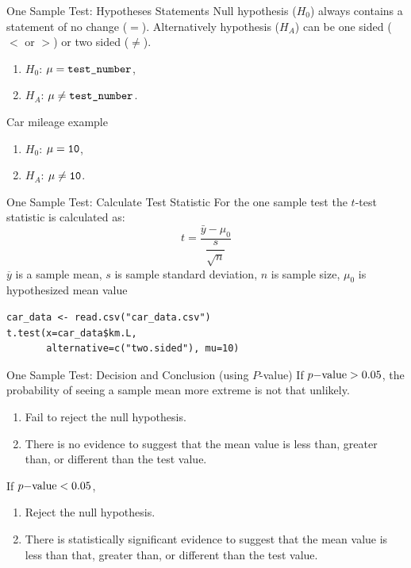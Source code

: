 \documentclass[xcolor=svgnames, 10pt, handout]{beamer}
\begin{document}
\begin{frame}[fragile]{One Sample Test: Hypotheses Statements}
Null hypothesis ($H_0$) always contains a statement of no change ($=$).
\vfill
Alternatively hypothesis ($H_A$) can be one sided ($<$ or $>$) or two sided ($\neq$).
\begin{enumerate}
\item $H_0$: $\mu = \verb|test_number|$,
\item $H_A$: $\mu \neq \verb|test_number|$.
\end{enumerate}
\vfill
Car mileage example
\begin{enumerate}
\item $H_0$: $\mu = \verb|10|$,
\item $H_A$: $\mu \neq \verb|10|$.
\end{enumerate}
\vfill
\end{frame}


\begin{frame}[fragile]{One Sample Test: Calculate Test Statistic}
\vfill
For the one sample test the $t$-test statistic is calculated as:
$$t = \dfrac{\bar y - \mu_0}{\dfrac{s}{\sqrt n}}$$
\vfill
$\overline y$ is a sample mean, $s$ is sample standard deviation, $n$ is sample size, $\mu_0$ is hypothesized mean value
\vfill
\begin{Verbatim}[xleftmargin=2em, xrightmargin=1.5em, frame=single, label=R code, framesep=0.5em]
car_data <- read.csv("car_data.csv")
t.test(x=car_data$km.L,
       alternative=c("two.sided"), mu=10)
\end{Verbatim}
\end{frame}


\begin{frame}[fragile]{One Sample Test: Decision and Conclusion (using $P$-value)}
\vfill
If $p{\rm-value} > 0.05$, the probability of seeing a sample mean more extreme is not that unlikely.
\begin{enumerate}
\item Fail to reject the null hypothesis.
\item There is no evidence to suggest that the mean value is less than, greater than, or different than the test value.
\end{enumerate}
\vfill
If $p{\rm-value} < 0.05$,
\begin{enumerate}
\item Reject the null hypothesis.
\item There is statistically significant evidence to suggest that the mean value is less than that, greater than, or different than the test value.
\end{enumerate}
\vfill
\end{frame}
\end{document}

